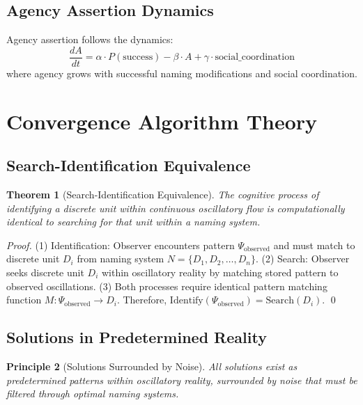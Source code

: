 \documentclass[11pt,twocolumn]{article}
\newtheorem{theorem}{Theorem}[section]
\newtheorem{principle}[theorem]{Principle}
\theoremstyle{remark}
\begin{document}
\subsection{Agency Assertion Dynamics}

Agency assertion follows the dynamics:
\begin{equation}
\frac{dA}{dt} = \alpha \cdot P(\text{success}) - \beta \cdot A + \gamma \cdot \text{social\_coordination}
\end{equation}
where agency grows with successful naming modifications and social coordination.

\section{Convergence Algorithm Theory}

\subsection{Search-Identification Equivalence}

\begin{theorem}[Search-Identification Equivalence]
The cognitive process of identifying a discrete unit within continuous oscillatory flow is computationally identical to searching for that unit within a naming system.
\end{theorem}

\begin{proof}
(1) Identification: Observer encounters pattern $\Psi_{\text{observed}}$ and must match to discrete unit $D_i$ from naming system $N = \{D_1, D_2, \ldots, D_n\}$. (2) Search: Observer seeks discrete unit $D_i$ within oscillatory reality by matching stored pattern to observed oscillations. (3) Both processes require identical pattern matching function $M: \Psi_{\text{observed}} \rightarrow D_i$. Therefore, $\text{Identify}(\Psi_{\text{observed}}) = \text{Search}(D_i)$. \qed
\end{proof}

\subsection{Solutions in Predetermined Reality}

\begin{principle}[Solutions Surrounded by Noise]
All solutions exist as predetermined patterns within oscillatory reality, surrounded by noise that must be filtered through optimal naming systems.
\end{principle}
\end{document}
